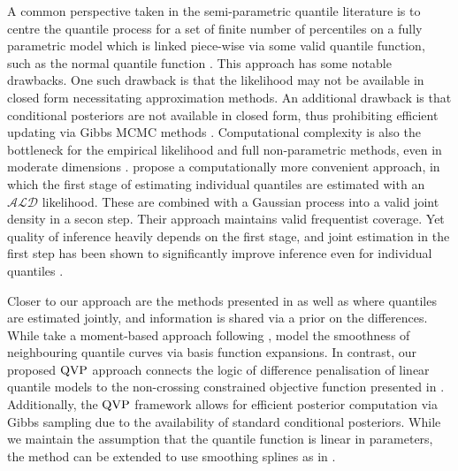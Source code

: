 A common perspective taken in the semi-parametric quantile literature is to centre the quantile process for a set of finite number of  percentiles on a fully parametric model which is linked piece-wise via some valid quantile function, such as the normal quantile function \citep{reich2013bayesian}. This approach has some notable drawbacks. One such drawback is that the likelihood may not be available in closed form \citep{reich2011bayesian} necessitating approximation methods. An additional drawback is that conditional posteriors are not available in closed form, thus prohibiting efficient updating via Gibbs MCMC methods \citep{reich2012spatiotemporal,reich2013bayesian}. Computational complexity is also the bottleneck for the empirical likelihood and full non-parametric methods, even in moderate dimensions \citep{rodrigues2017regression}.
\citet{rodrigues2017regression} propose a computationally more convenient approach, in which the first stage of estimating individual quantiles are estimated with an $\mathcal{ALD}$ likelihood. These are combined with a Gaussian process into a valid joint density in a secon step. Their approach maintains valid frequentist coverage. Yet quality of inference heavily depends on the first stage, and joint estimation in the first step has been shown to significantly improve inference even for individual quantiles \citep{bondell2010noncrossing}.

Closer to our approach are the methods presented in \citet{wu2021bayesian} as well as \citet{wang2024composite} where quantiles are estimated jointly, and information is shared via a prior on the differences. While \citet{wu2021bayesian} take a moment-based approach following \citet{chernozhukov2003mcmc}, \citet{wang2024composite} model the smoothness of neighbouring quantile curves via basis function expansions. In contrast, our proposed $\operatorname{QVP}$ approach connects the logic of difference penalisation of linear quantile models to the non-crossing constrained objective function presented in \citet{bondell2010noncrossing}. Additionally, the $\operatorname{QVP}$ framework allows for efficient posterior computation via Gibbs sampling due to the availability of standard conditional posteriors. While we maintain the assumption that the quantile function is linear in parameters, the method can be extended to use smoothing splines as in \citet{bondell2010noncrossing}. 
%

